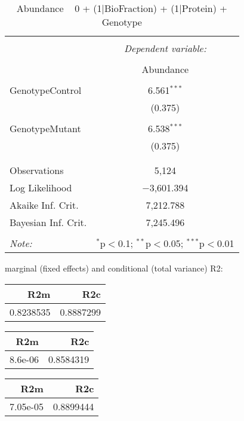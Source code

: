 \documentclass[11pt]{report}
\begin{document}
\begin{table}[!htbp] \centering 
  \caption{Abundance ~ 0 + (1|BioFraction) + (1|Protein) + Genotype} 
  \label{} 
\begin{tabular}{@{\extracolsep{5pt}}lc} 
\\[-1.8ex]\hline 
\hline \\[-1.8ex] 
 & \multicolumn{1}{c}{\textit{Dependent variable:}} \\ 
\cline{2-2} 
\\[-1.8ex] & Abundance \\ 
\hline \\[-1.8ex] 
 GenotypeControl & 6.561$^{***}$ \\ 
  & (0.375) \\ 
  & \\ 
 GenotypeMutant & 6.538$^{***}$ \\ 
  & (0.375) \\ 
  & \\ 
\hline \\[-1.8ex] 
Observations & 5,124 \\ 
Log Likelihood & $-$3,601.394 \\ 
Akaike Inf. Crit. & 7,212.788 \\ 
Bayesian Inf. Crit. & 7,245.496 \\ 
\hline 
\hline \\[-1.8ex] 
\textit{Note:}  & \multicolumn{1}{r}{$^{*}$p$<$0.1; $^{**}$p$<$0.05; $^{***}$p$<$0.01} \\ 
\end{tabular} 
\end{table} 
marginal (fixed effects) and conditional (total variance) R2:

\begin{tabular}{r|r}
\hline
R2m & R2c\\
\hline
0.8238535 & 0.8887299\\
\hline
\end{tabular}

\begin{tabular}{r|r}
\hline
R2m & R2c\\
\hline
8.6e-06 & 0.8584319\\
\hline
\end{tabular}

\begin{tabular}{r|r}
\hline
R2m & R2c\\
\hline
7.05e-05 & 0.8899444\\
\hline
\end{tabular}
\end{document}
